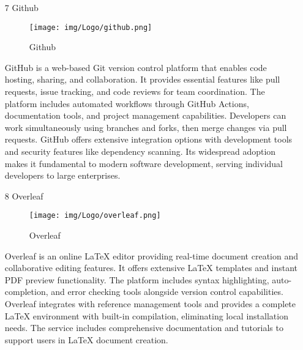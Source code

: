 \documentclass[conference]{IEEEtran}
\begin{document}
\begin{enumerate}
    \item[7] Github\par
    \vspace{0.3em}
    \begin{figure}[h]
    \centering
    \texttt{[image: img/Logo/github.png]}
    \centering
    \caption{Github} 
    \end{figure}\par
    \vspace{0.3em}
    GitHub is a web-based Git version control platform that enables code hosting, sharing, and collaboration. It provides essential features like pull requests, issue tracking, and code reviews for team coordination. The platform includes automated workflows through GitHub Actions, documentation tools, and project management capabilities. Developers can work simultaneously using branches and forks, then merge changes via pull requests. GitHub offers extensive integration options with development tools and security features like dependency scanning. Its widespread adoption makes it fundamental to modern software development, serving individual developers to large enterprises.

    \vspace{1em}
    \newpage

    \item[8] Overleaf\par
    \vspace{3em}
    \begin{figure}[h]
    \centering
    \texttt{[image: img/Logo/overleaf.png]}
    \centering
    \caption{Overleaf} 
    \end{figure}\par
    \vspace{3em}
    Overleaf is an online LaTeX editor providing real-time document creation and collaborative editing features. It offers extensive LaTeX templates and instant PDF preview functionality. The platform includes syntax highlighting, auto-completion, and error checking tools alongside version control capabilities. Overleaf integrates with reference management tools and provides a complete LaTeX environment with built-in compilation, eliminating local installation needs. The service includes comprehensive documentation and tutorials to support users in LaTeX document creation.

    \vspace{1em}
    

\end{enumerate}
\end{document}
